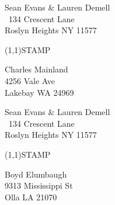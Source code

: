 \documentclass[12pt]{article}
\begin{document}
\clearpage

\begin{minipage}{.5\linewidth} \noindent
Sean Evans \& Lauren Demell\\\ 
134 Crescent Lane\\ 
Roslyn Heights NY 11577
\end{minipage}
\begin{minipage}{.5\linewidth \hspace{-.2in} \vspace{-.3in}}
\begin{flushright}
\framebox(1,1){STAMP}
\end{flushright}
\end{minipage}

\begin{center} \begin{Huge} \vspace*{\fill}
Charles Mainland\\
4256 Vale Ave\\
Lakebay WA 24969\\
\vspace{\fill} \end{Huge} \end{center}

\clearpage

\begin{minipage}{.5\linewidth} \noindent
Sean Evans \& Lauren Demell\\\ 
134 Crescent Lane\\ 
Roslyn Heights NY 11577
\end{minipage}
\begin{minipage}{.5\linewidth \hspace{-.2in} \vspace{-.3in}}
\begin{flushright}
\framebox(1,1){STAMP}
\end{flushright}
\end{minipage}

\begin{center} \begin{Huge} \vspace*{\fill}
Boyd Elumbaugh\\
9313 Mississippi St\\
Olla LA 21070\\
\vspace{\fill} \end{Huge} \end{center}

\clearpage
\end{document}
